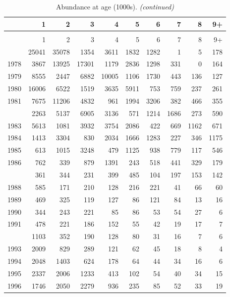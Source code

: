 \documentclass[
]{article}
\begin{document}
\begin{longtable}[t]{lrrrrrrrrr}
\caption{\label{tab:NAA-table}Abundance at age (1000s).}\\
\toprule
  & 1 & 2 & 3 & 4 & 5 & 6 & 7 & 8 & 9+\\
\midrule
\endfirsthead
\caption[]{Abundance at age (1000s). \textit{(continued)}}\\
\toprule
  & 1 & 2 & 3 & 4 & 5 & 6 & 7 & 8 & 9+\\
\midrule
\endhead

\endfoot
\bottomrule
\endlastfoot
1977 & 25041 & 35078 & 1354 & 3611 & 1832 & 1282 & 1 & 5 & 178\\
1978 & 3867 & 13925 & 17301 & 1179 & 2836 & 1298 & 331 & 0 & 164\\
1979 & 8555 & 2447 & 6882 & 10005 & 1106 & 1730 & 443 & 136 & 127\\
1980 & 16006 & 6522 & 1519 & 3635 & 5911 & 753 & 759 & 237 & 261\\
1981 & 7675 & 11206 & 4832 & 961 & 1994 & 3206 & 382 & 466 & 355\\
\addlinespace
1982 & 2263 & 5137 & 6905 & 3136 & 571 & 1214 & 1686 & 273 & 590\\
1983 & 5613 & 1081 & 3932 & 3754 & 2086 & 422 & 669 & 1162 & 671\\
1984 & 1413 & 3304 & 830 & 2034 & 1666 & 1283 & 227 & 346 & 1175\\
1985 & 613 & 1015 & 3248 & 479 & 1125 & 938 & 779 & 117 & 546\\
1986 & 762 & 339 & 879 & 1391 & 243 & 518 & 441 & 329 & 179\\
\addlinespace
1987 & 361 & 344 & 231 & 399 & 485 & 104 & 197 & 153 & 142\\
1988 & 585 & 171 & 210 & 128 & 216 & 221 & 41 & 66 & 60\\
1989 & 469 & 325 & 119 & 127 & 86 & 121 & 84 & 13 & 16\\
1990 & 344 & 243 & 221 & 85 & 86 & 53 & 54 & 27 & 6\\
1991 & 478 & 221 & 186 & 152 & 55 & 42 & 19 & 17 & 7\\
\addlinespace
1992 & 1103 & 352 & 190 & 128 & 80 & 31 & 16 & 7 & 6\\
1993 & 2009 & 829 & 289 & 121 & 62 & 45 & 18 & 8 & 4\\
1994 & 2048 & 1403 & 624 & 178 & 64 & 44 & 34 & 16 & 6\\
1995 & 2337 & 2006 & 1233 & 413 & 102 & 54 & 40 & 34 & 15\\
1996 & 1746 & 2050 & 2279 & 936 & 235 & 85 & 52 & 33 & 19\\

\end{longtable}
\end{document}
